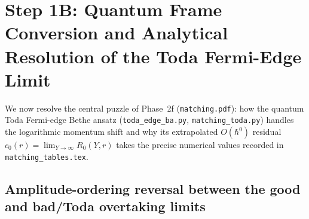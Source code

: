 \documentclass[11pt,a4paper]{article}
\newcommand{\hb}{\hbar}
\begin{document}
\section{Step 1B: Quantum Frame Conversion and Analytical Resolution of the Toda Fermi-Edge Limit}
\label{sec:toda}

We now resolve the central puzzle of Phase~2f (\texttt{matching.pdf}): how the
quantum Toda Fermi-edge Bethe ansatz (\texttt{toda\_edge\_ba.py},
\texttt{matching\_toda.py}) handles the logarithmic momentum shift and why its
extrapolated $O(\hb^0)$ residual $c_0(r) = \lim_{Y\to\infty} R_0(Y,r)$ takes the
precise numerical values recorded in \texttt{matching\_tables.tex}.

\subsection{Amplitude-ordering reversal between the good and bad/Toda overtaking limits}
\end{document}
